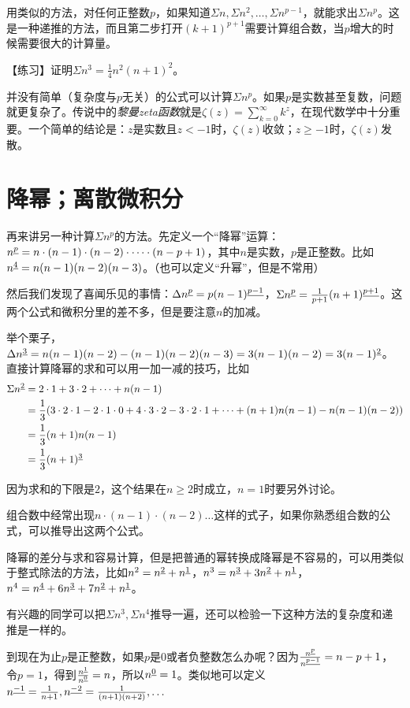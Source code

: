 用类似的方法，对任何正整数$p$，如果知道$\Sigma n,\Sigma n^2,\dots,\Sigma n^{p-1}$，就能求出$\Sigma n^p$。这是一种递推的方法，而且第二步打开$(k+1)^{p+1}$需要计算组合数，当$p$增大的时候需要很大的计算量。

【练习】证明$\Sigma n^3=\frac{1}{4}n^2 (n+1)^2$。

并没有简单（复杂度与$p$无关）的公式可以计算$\Sigma n^p$。如果$p$是实数甚至复数，问题就更复杂了。传说中的\emph{黎曼zeta函数}就是$\zeta(z)=\sum_{k=0}^{\infty} k^z$，在现代数学中十分重要。一个简单的结论是：$z$是实数且$z<-1$时，$\zeta(z)$收敛；$z \ge -1$时，$\zeta(z)$发散。
\section{降幂；离散微积分}
再来讲另一种计算$\Sigma n^p$的方法。先定义一个“降幂”运算：$n^{\underline{p}}=n \cdot (n-1) \cdot (n-2) \cdot \dots \cdot (n-p+1)$，其中$n$是实数，$p$是正整数。比如$n^{\underline{4}}=n(n-1)(n-2)(n-3)$。（也可以定义“升幂”，但是不常用）

然后我们发现了喜闻乐见的事情：$\Delta n^{\underline{p}}=p (n-1)^{\underline{p-1}}$，$\Sigma n^{\underline{p}}=\frac{1}{p+1} (n+1)^{\underline{p+1}}$。这两个公式和微积分里的差不多，但是要注意$n$的加减。

举个栗子，$\Delta n^{\underline{3}}=n(n-1)(n-2)-(n-1)(n-2)(n-3)=3(n-1)(n-2)=3 (n-1)^{\underline{2}}$。直接计算降幂的求和可以用一加一减的技巧，比如
\begin{align*}
\Sigma n^{\underline{2}}&=2 \cdot 1+3 \cdot 2 +\dots+ n(n-1) \\
&=\frac{1}{3}(3 \cdot 2 \cdot 1-2 \cdot 1 \cdot 0+4 \cdot 3 \cdot 2-3 \cdot 2 \cdot 1+\dots+(n+1)n(n-1)-n(n-1)(n-2)) \\
&=\frac{1}{3}(n+1)n(n-1) \\
&=\frac{1}{3} (n+1)^{\underline{3}}
\end{align*}

因为求和的下限是$2$，这个结果在$n \ge 2$时成立，$n=1$时要另外讨论。

组合数中经常出现$n \cdot (n-1) \cdot (n-2) \dots$这样的式子，如果你熟悉组合数的公式，可以推导出这两个公式。

降幂的差分与求和容易计算，但是把普通的幂转换成降幂是不容易的，可以用类似于整式除法的方法，比如$n^2=n^{\underline{2}}+n^{\underline{1}}$，$n^3=n^{\underline{3}}+3 n^{\underline{2}}+n^{\underline{1}}$，$n^4=n^{\underline{4}}+6 n^{\underline{3}}+7 n^{\underline{2}}+n^{\underline{1}}$。

有兴趣的同学可以把$\Sigma n^3,\Sigma n^4$推导一遍，还可以检验一下这种方法的复杂度和递推是一样的。

到现在为止$p$是正整数，如果$p$是$0$或者负整数怎么办呢？因为$\frac{n^{\underline{p}}}{n^{\underline{p-1}}}=n-p+1$，令$p=1$，得到$\frac{n^{\underline{1}}}{n^{\underline{0}}}=n$，所以$n^{\underline{0}}=1$。类似地可以定义$n^{\underline{-1}}=\frac{1}{n+1},n^{\underline{-2}}=\frac{1}{(n+1)(n+2)},\dots$


